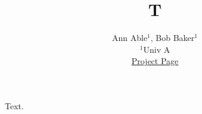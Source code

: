 \documentclass{article}
\title{T}
\author{Ann Able$^1$, Bob Baker$^1$ \\ $^1$Univ A \\ \href{https://x.org/proj}{Project Page}}
\begin{document}
\maketitle
Text.
\end{document}
